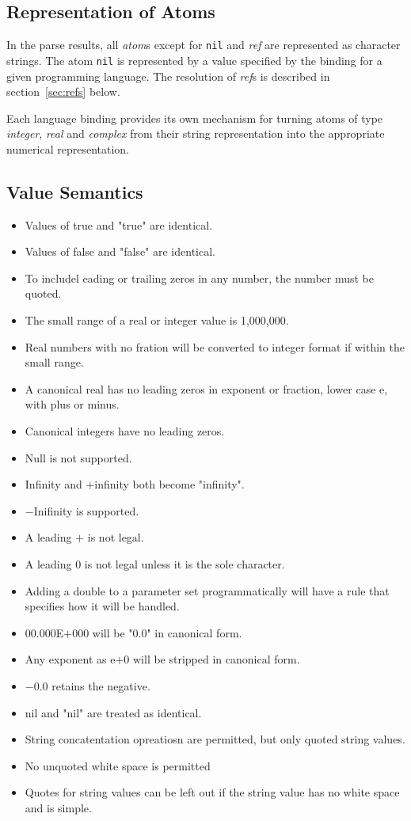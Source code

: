 \documentclass{article}
\begin{document}
	\subsection{Representation of Atoms}
		In the parse results,
		all \emph{atom}s
		except for \texttt{nil} and \emph{ref}
		are represented
		as character strings.
		The atom \texttt{nil} is represented by a 
		value specified by the binding for a given programming language.
		The resolution of \emph{ref}s is described in section~\ref{sec:refs} below.
		\vspace{1mm}
		\par
		Each language binding
		provides its own mechanism
		for turning atoms of type \emph{integer}, \emph{real} and \emph{complex}
		from their string representation
		into the appropriate numerical representation.
	\subsection{Value Semantics}
		\begin{itemize}
			\item Values of true and "true" are identical.
			\item Values of false and "false" are identical.
			\item To includel eading or trailing zeros in any number,
					the number must be quoted.
			\item The small range of a real or integer value is 1,000,000.
			\item Real numbers with no fration will be converted to integer format
					if within the small range.
			\item A canonical real has no leading zeros in exponent or fraction, lower case e, with plus or minus.
			\item Canonical integers have no leading zeros.
			\item Null is not supported.
			\item Infinity and $+$infinity both become "infinity".
			\item $-$Inifinity is supported.
			\item A leading $+$ is not legal.
			\item A leading 0 is not legal unless it is the sole character.
			\item Adding a double to a parameter set programmatically will have a rule that specifies how it will be handled.
			\item 00.000E$+$000 will be "0.0" in canonical form.
			\item Any exponent as e$+$0 will be stripped in canonical form.
			\item $-$0.0 retains the negative.
			\item nil and "nil" are treated as identical.
			\item String concatentation opreatiosn are permitted, but only quoted string values.
			\item No unquoted white space is permitted
			\item Quotes for string values can be left out if the string value has no white space and is simple.
		\end{itemize}
\end{document}
